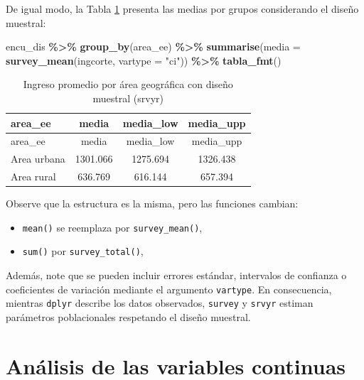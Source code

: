\documentclass[
  spanish,
  12pt,
]{book}
\newenvironment{Shaded}{\begin{snugshade}}{\end{snugshade}}
\newcommand{\AttributeTok}[1]{\textcolor[rgb]{0.13,0.29,0.53}{#1}}
\newcommand{\FunctionTok}[1]{\textcolor[rgb]{0.13,0.29,0.53}{\textbf{#1}}}
\newcommand{\NormalTok}[1]{#1}
\newcommand{\SpecialCharTok}[1]{\textcolor[rgb]{0.81,0.36,0.00}{\textbf{#1}}}
\newcommand{\StringTok}[1]{\textcolor[rgb]{0.31,0.60,0.02}{#1}}
\providecommand{\tightlist}{%
  \setlength{\itemsep}{0pt}\setlength{\parskip}{0pt}}
\begin{document}
De igual modo, la Tabla \ref{tab:tab-media-area-srvyr} presenta las medias por grupos considerando el diseño muestral:

\begin{Shaded}
\begin{Highlighting}[]
\NormalTok{encu\_dis }\SpecialCharTok{\%\textgreater{}\%}
  \FunctionTok{group\_by}\NormalTok{(area\_ee) }\SpecialCharTok{\%\textgreater{}\%}
  \FunctionTok{summarise}\NormalTok{(}\AttributeTok{media =} \FunctionTok{survey\_mean}\NormalTok{(ingcorte, }\AttributeTok{vartype =} \StringTok{"ci"}\NormalTok{)) }\SpecialCharTok{\%\textgreater{}\%}
  \FunctionTok{tabla\_fmt}\NormalTok{()}
\end{Highlighting}
\end{Shaded}

\begin{longtable}[]{@{}lccc@{}}
\caption{\label{tab:tab-media-area-srvyr}Ingreso promedio por área geográfica con diseño muestral (srvyr)}\tabularnewline
\toprule\noalign{}
area\_ee & media & media\_low & media\_upp \\
\midrule\noalign{}
\endfirsthead
\toprule\noalign{}
area\_ee & media & media\_low & media\_upp \\
\midrule\noalign{}
\endhead
\bottomrule\noalign{}
\endlastfoot
Area urbana & 1301.066 & 1275.694 & 1326.438 \\
Area rural & 636.769 & 616.144 & 657.394 \\
\end{longtable}

Observe que la estructura es la misma, pero las funciones cambian:

\begin{itemize}
\tightlist
\item
  \texttt{mean()} se reemplaza por \texttt{survey\_mean()},
\item
  \texttt{sum()} por \texttt{survey\_total()},
\end{itemize}

Además, note que se pueden incluir errores estándar, intervalos de confianza o coeficientes de variación mediante el argumento \texttt{vartype}. En consecuencia, mientras \texttt{dplyr} describe los datos observados, \texttt{survey} y \texttt{srvyr} estiman parámetros poblacionales respetando el diseño muestral.

\chapter{Análisis de las variables continuas}\label{cap4}
\end{document}
